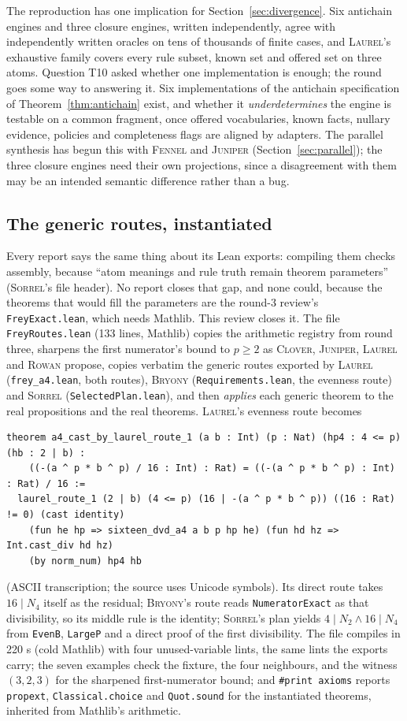 \documentclass[11pt,a4paper]{article}
\newcommand{\code}[1]{\nolinkurl{#1}}
\newcommand{\Br}{\textsc{Bryony}}
\newcommand{\Cl}{\textsc{Clover}}
\newcommand{\Fe}{\textsc{Fennel}}
\newcommand{\Ju}{\textsc{Juniper}}
\newcommand{\La}{\textsc{Laurel}}
\newcommand{\Ro}{\textsc{Rowan}}
\newcommand{\So}{\textsc{Sorrel}}
\theoremstyle{definition}
\theoremstyle{plain}
\begin{document}
The reproduction has one implication for Section~\ref{sec:divergence}. Six antichain engines and three closure engines, written independently, agree with independently written oracles on tens of thousands of finite cases, and \La's exhaustive family covers every rule subset, known set and offered set on three atoms. Question T10 asked whether one implementation is enough; the round goes some way to answering it. Six implementations of the antichain specification of Theorem~\ref{thm:antichain} exist, and whether it \emph{underdetermines} the engine is testable on a common fragment, once offered vocabularies, known facts, nullary evidence, policies and completeness flags are aligned by adapters. The parallel synthesis has begun this with \Fe{} and \Ju{} (Section~\ref{sec:parallel}); the three closure engines need their own projections, since a disagreement with them may be an intended semantic difference rather than a bug.

\subsection{The generic routes, instantiated}\label{sec:routes}
Every report says the same thing about its Lean exports: compiling them checks assembly, because ``atom meanings and rule truth remain theorem parameters'' (\So's file header). No report closes that gap, and none could, because the theorems that would fill the parameters are the round-3 review's \code{FreyExact.lean}, which needs Mathlib. This review closes it. The file \code{FreyRoutes.lean} (133 lines, Mathlib) copies the arithmetic registry from round three, sharpens the first numerator's bound to $p\ge2$ as \Cl, \Ju, \La{} and \Ro{} propose, copies verbatim the generic routes exported by \La{} (\code{frey_a4.lean}, both routes), \Br{} (\code{Requirements.lean}, the evenness route) and \So{} (\code{SelectedPlan.lean}), and then \emph{applies} each generic theorem to the real propositions and the real theorems. \La's evenness route becomes
\begin{lstlisting}
theorem a4_cast_by_laurel_route_1 (a b : Int) (p : Nat) (hp4 : 4 <= p) (hb : 2 | b) :
    ((-(a ^ p * b ^ p) / 16 : Int) : Rat) = ((-(a ^ p * b ^ p) : Int) : Rat) / 16 :=
  laurel_route_1 (2 | b) (4 <= p) (16 | -(a ^ p * b ^ p)) ((16 : Rat) != 0) (cast identity)
    (fun he hp => sixteen_dvd_a4 a b p hp he) (fun hd hz => Int.cast_div hd hz)
    (by norm_num) hp4 hb
\end{lstlisting}
(ASCII transcription; the source uses Unicode symbols). Its direct route takes $16\mid N_4$ itself as the residual; \Br's route reads \code{NumeratorExact} as that divisibility, so its middle rule is the identity; \So's plan yields $4\mid N_2\wedge16\mid N_4$ from \code{EvenB}, \code{LargeP} and a direct proof of the first divisibility. The file compiles in 220 s (cold Mathlib) with four unused-variable lints, the same lints the exports carry; the seven examples check the fixture, the four neighbours, and the witness $(3,2,3)$ for the sharpened first-numerator bound; and \texttt{\#print axioms} reports \code{propext}, \code{Classical.choice} and \code{Quot.sound} for the instantiated theorems, inherited from Mathlib's arithmetic.
\end{document}

